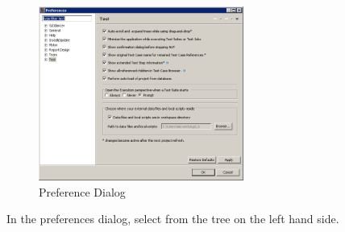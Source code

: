 \label{gdprefs}

\begin{figure}[h]
\begin{center}
\includegraphics[width=0.60\textwidth]{Tasks/Preferences/PS/gdprefs}
\caption{Preference Dialog}
\label{gdprefs}
\end{center}
\end{figure}

 In the preferences dialog, select  from the tree on the left hand side.

